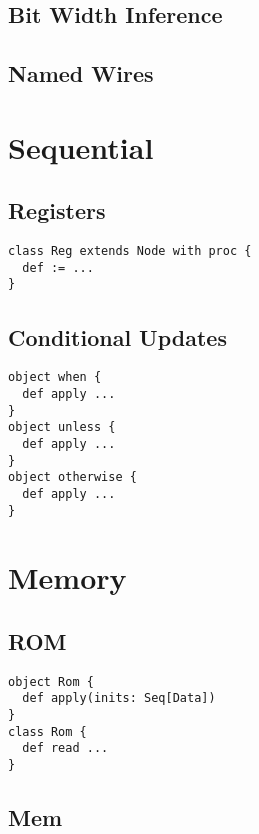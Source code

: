 \documentclass[10pt,twocolumn]{article}
\begin{document}
\begin{verbatim}
\end{verbatim}

\subsection{Bit Width Inference}

\subsection{Named Wires}

\section{Sequential}

\subsection{Registers}

\begin{verbatim}
class Reg extends Node with proc {
  def := ...
}
\end{verbatim}

\subsection{Conditional Updates}

\begin{verbatim}
object when {
  def apply ...
}
object unless {
  def apply ...
}
object otherwise {
  def apply ...
}
\end{verbatim}

\section{Memory}

\subsection{ROM}

\begin{verbatim}
object Rom {
  def apply(inits: Seq[Data])
}
class Rom {
  def read ...
}
\end{verbatim}

\subsection{Mem}
\end{document}
